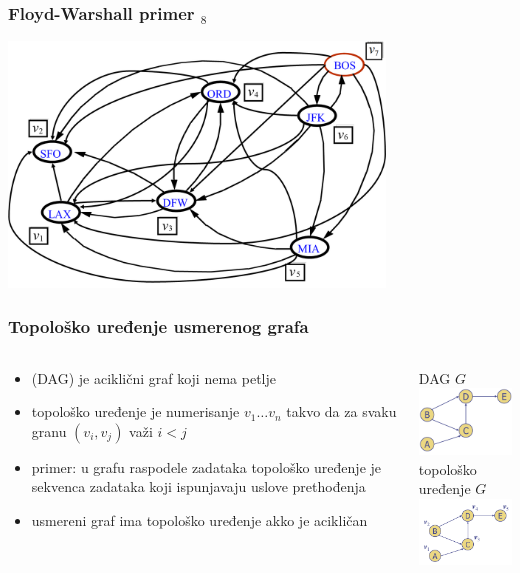 \documentclass[compress]{beamer}
\begin{document}
\begin{frame}[fragile]
  \frametitle{Floyd-Warshall primer $_8$}
  \begin{center}
    \includegraphics[width=10cm]{asp-14-pic44.png}
  \end{center}
\end{frame}

\begin{frame}[fragile]
  \frametitle{Topološko uređenje usmerenog grafa}
  \begin{columns}
    \begin{column}[t]{6cm}
      \begin{itemize}
        \item {} (DAG) je aciklični graf 
          koji nema petlje
        \item topološko uređenje je numerisanje $v_{1} \ldots v_{n}$
          takvo da za svaku granu $(v_{i},v_{j})$ važi $i<j$
        \item primer: u grafu raspodele zadataka topološko uređenje je
          sekvenca zadataka koji ispunjavaju uslove prethođenja
        \item usmereni graf ima topološko uređenje akko je acikličan
      \end{itemize}
    \end{column}
    \begin{column}[t]{6cm}
      \begin{center}
        \hfill DAG $G$ \\
        \includegraphics[width=4cm]{asp-14-pic45.png} \\ 
        \hfill topološko uređenje $G$ \\
        \includegraphics[width=4.5cm]{asp-14-pic46.png}
      \end{center}
    \end{column}
  \end{columns}
\end{frame}
\end{document}
